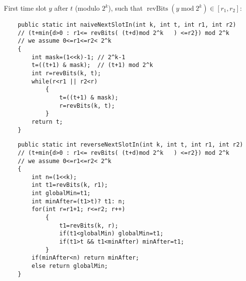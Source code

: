 \documentclass{letter}
\newcommand{\tmop}[1]{\ensuremath{\operatorname{#1}}}
\begin{document}
First time slot $y$ after $t$ (modulo $2^k$), such that $\tmop{revBits} (y
\tmop{mod} 2^k) \in [r_1, r_2]$:
\begin{verbatim}
    public static int naiveNextSlotIn(int k, int t, int r1, int r2)
    // (t+min{d>0 : r1<= revBits( (t+d)mod 2^k   ) <=r2}) mod 2^k 
    // we assume 0<=r1<=r2< 2^k 
    {
        int mask=(1<<k)-1; // 2^k-1 
        t=((t+1) & mask);  // (t+1) mod 2^k
        int r=revBits(k, t);
        while(r<r1 || r2<r)
            {
                t=((t+1) & mask);
                r=revBits(k, t);
            }
        return t;
    }
\end{verbatim}
\begin{verbatim}
    public static int reverseNextSlotIn(int k, int t, int r1, int r2)
    // (t+min{d>0 : r1<= revBits( (t+d)mod 2^k   ) <=r2}) mod 2^k 
    // we assume 0<=r1<=r2< 2^k 
    {
        int n=(1<<k);
        int t1=revBits(k, r1);
        int globalMin=t1;
        int minAfter=(t1>t)? t1: n;
        for(int r=r1+1; r<=r2; r++)
            {
                t1=revBits(k, r);
                if(t1<globalMin) globalMin=t1;
                if(t1>t && t1<minAfter) minAfter=t1;
            }
        if(minAfter<n) return minAfter;
        else return globalMin; 
    }
\end{verbatim}
\end{document}
